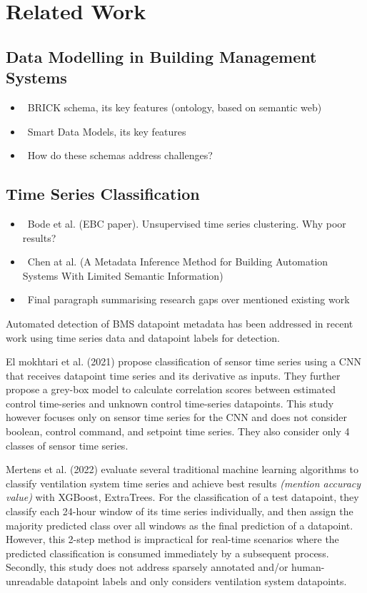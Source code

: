 \section{Related Work}

\subsection{Data Modelling in Building Management Systems}

\begin{itemize}[label={}]
	\color{red}
		\item \lbrack\  \rbrack BRICK schema, its key features (ontology, based on semantic web)
		\item \lbrack\  \rbrack	Smart Data Models, its key features
		\item \lbrack\  \rbrack How do these schemas address challenges?
\end{itemize}

\subsection{Time Series Classification}

\begin{itemize}[label={}]
	\color{red}
		\item \lbrack\  \rbrack Bode et al. (EBC paper). Unsupervised time series clustering. Why poor results?
		\item \lbrack\  \rbrack Chen at al. (A Metadata Inference Method for Building Automation Systems With Limited Semantic Information)
		\item \lbrack\  \rbrack Final paragraph summarising research gaps over mentioned existing work
\end{itemize}

Automated detection of BMS datapoint metadata has been addressed in recent work using time series data and datapoint labels for detection. 

El mokhtari et al. (2021) propose classification of sensor time series using a CNN that receives datapoint time series and its derivative as inputs. They further propose a grey-box model to calculate correlation scores between estimated control time-series and unknown control time-series datapoints. This study however focuses only on sensor time series for the CNN and does not consider boolean, control command, and setpoint time series. They also consider only 4 classes of sensor time series.

Mertens et al. (2022) evaluate several traditional machine learning algorithms to classify ventilation system time series and achieve best results \emph{(mention accuracy value)} with XGBoost, ExtraTrees. For the classification of a test datapoint, they classify each 24-hour window of its time series individually, and then assign the majority predicted class over all windows as the final prediction of a datapoint. However, this 2-step method is impractical for real-time scenarios where the predicted classification is consumed immediately by a subsequent process. Secondly, this study does not address sparsely annotated and/or human-unreadable datapoint labels and only considers ventilation system datapoints.

